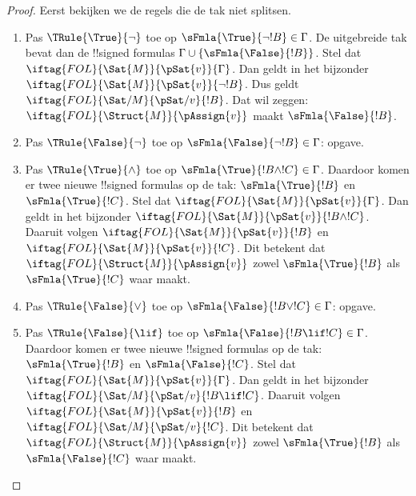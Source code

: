 \documentclass[openany]{memoir}
\begin{document}
\begin{proof}
Eerst bekijken we de regels die de tak niet splitsen.
\begin{enumerate}
\item Pas $\TRule{\True}{\lnot}$ toe op
  $\sFmla{\True}{\lnot !B} \in \Gamma$. De uitgebreide tak bevat dan
  de !!{signed formula}s $\Gamma \cup
  \{\sFmla{\False}{!B}\}$. Stel dat
  $\iftag{FOL}{\Sat{M}}{\pSat{v}}{\Gamma}$. Dan geldt in het bijzonder
  $\iftag{FOL}{\Sat{M}}{\pSat{v}}{\lnot !B}$. Dus geldt
  $\iftag{FOL}{\Sat/{M}}{\pSat/{v}}{!B}$. Dat wil zeggen:
  $\iftag{FOL}{\Struct{M}}{\pAssign{v}}$ maakt
  $\sFmla{\False}{!B}$.
\item Pas $\TRule{\False}{\lnot}$ toe op
  $\sFmla{\False}{\lnot !B} \in \Gamma$: opgave.
\item Pas $\TRule{\True}{\land}$ toe op
  $\sFmla{\True}{!B \land !C} \in \Gamma$. Daardoor komen er twee
  nieuwe !!{signed formula}s op de tak: $\sFmla{\True}{!B}$ en
  $\sFmla{\True}{!C}$. Stel dat
  $\iftag{FOL}{\Sat{M}}{\pSat{v}}{\Gamma}$. Dan geldt in het bijzonder
  $\iftag{FOL}{\Sat{M}}{\pSat{v}}{!B \land !C}$. Daaruit volgen
  $\iftag{FOL}{\Sat{M}}{\pSat{v}}{!B}$ en
  $\iftag{FOL}{\Sat{M}}{\pSat{v}}{!C}$. Dit betekent dat
  $\iftag{FOL}{\Struct{M}}{\pAssign{v}}$ zowel
  $\sFmla{\True}{!B}$ als $\sFmla{\True}{!C}$ waar maakt.
\item Pas $\TRule{\False}{\lor}$ toe op
  $\sFmla{\False}{!B \lor !C} \in \Gamma$: opgave.
\item Pas $\TRule{\False}{\lif}$ toe op
  $\sFmla{\False}{!B \lif !C} \in \Gamma$. Daardoor komen er twee
  nieuwe !!{signed formula}s op de tak: $\sFmla{\True}{!B}$ en
  $\sFmla{\False}{!C}$. Stel dat
  $\iftag{FOL}{\Sat{M}}{\pSat{v}}{\Gamma}$. Dan geldt in het bijzonder
  $\iftag{FOL}{\Sat/{M}}{\pSat/{v}}{!B \lif !C}$. Daaruit volgen
  $\iftag{FOL}{\Sat{M}}{\pSat{v}}{!B}$ en
  $\iftag{FOL}{\Sat/{M}}{\pSat/{v}}{!C}$. Dit betekent dat
  $\iftag{FOL}{\Struct{M}}{\pAssign{v}}$ zowel
  $\sFmla{\True}{!B}$ als $\sFmla{\False}{!C}$ waar maakt.

\end{enumerate}
\end{proof}
\end{document}
